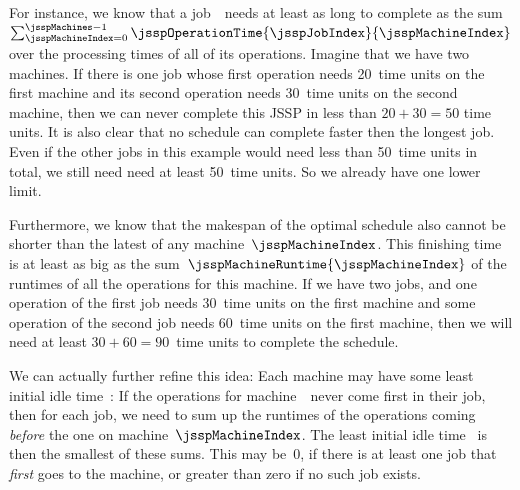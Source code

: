 For instance, we know that a job~\jsspJobIndex\ needs at least as long to complete as the sum~$\sum_{\jsspMachineIndex=0}^{\jsspMachines-1} \jsspOperationTime{\jsspJobIndex}{\jsspMachineIndex}$ over the processing times of all of its operations.
Imagine that we have two machines.
If there is one job whose first operation needs 20~time units on the first machine and its second operation needs 30~time units on the second machine, then we can never complete this \gls{JSSP} in less than $20+30=50$ time units.
It is also clear that no schedule can complete faster then the longest job.
Even if the other jobs in this example would need less than 50~time units in total, we still need need at least 50~time units.
So we already have one lower limit.

Furthermore, we know that the makespan of the optimal schedule also cannot be shorter than the latest  of any machine~$\jsspMachineIndex$.
This finishing time is at least as big as the sum~$\jsspMachineRuntime{\jsspMachineIndex}$ of the runtimes of all the operations for this machine.
If we have two jobs, and one operation of the first job needs 30~time units on the first machine and some operation of the second job needs 60~time units on the first machine, then we will need at least $30+60=90$~time units to complete the schedule.

We can actually further refine this idea:
Each machine may have some least initial idle time~\jsspMachineStartIdle{\jsspMachineIndex}:
If the operations for machine~\jsspMachineIndex\ never come first in their job, then for each job, we need to sum up the runtimes of the operations coming \emph{before} the one on machine~$\jsspMachineIndex$.
The least initial idle time~\jsspMachineStartIdle{\jsspMachineIndex} is then the smallest of these sums.
This may be~0, if there is at least one job that \emph{first} goes to the machine, or greater than zero if no such job exists.

